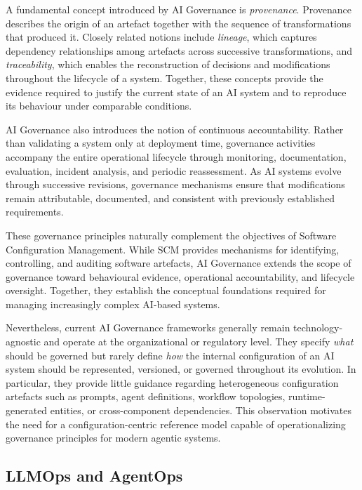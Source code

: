 \documentclass[10pt]{article}
\begin{document}
A fundamental concept introduced by AI Governance is \emph{provenance}. Provenance describes the origin of an artefact together with the sequence of transformations that produced it. Closely related notions include \emph{lineage}, which captures dependency relationships among artefacts across successive transformations, and \emph{traceability}, which enables the reconstruction of decisions and modifications throughout the lifecycle of a system. Together, these concepts provide the evidence required to justify the current state of an AI system and to reproduce its behaviour under comparable conditions.

AI Governance also introduces the notion of continuous accountability. Rather than validating a system only at deployment time, governance activities accompany the entire operational lifecycle through monitoring, documentation, evaluation, incident analysis, and periodic reassessment. As AI systems evolve through successive revisions, governance mechanisms ensure that modifications remain attributable, documented, and consistent with previously established requirements.

These governance principles naturally complement the objectives of Software Configuration Management. While SCM provides mechanisms for identifying, controlling, and auditing software artefacts, AI Governance extends the scope of governance toward behavioural evidence, operational accountability, and lifecycle oversight. Together, they establish the conceptual foundations required for managing increasingly complex AI-based systems.

Nevertheless, current AI Governance frameworks generally remain technology-agnostic and operate at the organizational or regulatory level. They specify \emph{what} should be governed but rarely define \emph{how} the internal configuration of an AI system should be represented, versioned, or governed throughout its evolution. In particular, they provide little guidance regarding heterogeneous configuration artefacts such as prompts, agent definitions, workflow topologies, runtime-generated entities, or cross-component dependencies. This observation motivates the need for a configuration-centric reference model capable of operationalizing governance principles for modern agentic systems.

\subsection{LLMOps and AgentOps}
\label{sec:llmops_agentops}
\end{document}
